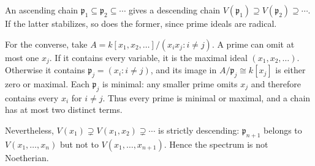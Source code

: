 An ascending chain $\mathfrak p_1\subseteq\mathfrak p_2\subseteq\cdots$ gives a descending chain $V(\mathfrak p_1)\supseteq V(\mathfrak p_2)\supseteq\cdots$. If the latter stabilizes, so does the former, since prime ideals are radical.

For the converse, take $A=k[x_1,x_2,\ldots]/(x_ix_j:i\ne j)$. A prime can omit at most one $x_j$. If it contains every variable, it is the maximal ideal $(x_1,x_2,\ldots)$. Otherwise it contains $\mathfrak p_j=(x_i:i\ne j)$, and its image in $A/\mathfrak p_j\cong k[x_j]$ is either zero or maximal. Each $\mathfrak p_j$ is minimal: any smaller prime omits $x_j$ and therefore contains every $x_i$ for $i\ne j$. Thus every prime is minimal or maximal, and a chain has at most two distinct terms.

Nevertheless, $V(x_1)\supsetneq V(x_1,x_2)\supsetneq\cdots$ is strictly descending: $\mathfrak p_{n+1}$ belongs to $V(x_1,\ldots,x_n)$ but not to $V(x_1,\ldots,x_{n+1})$. Hence the spectrum is not Noetherian.
